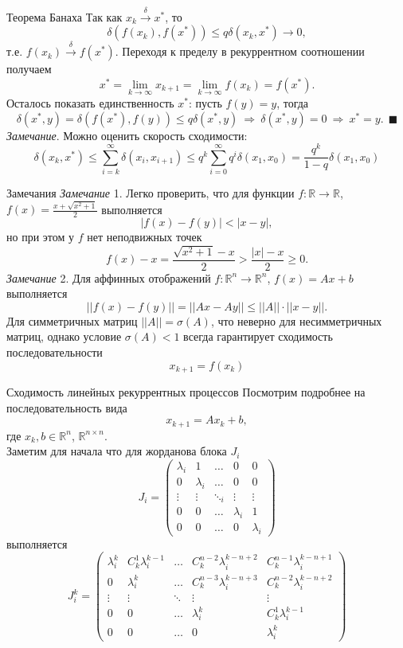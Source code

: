 \documentclass[10pt, handout]{beamer}
\begin{document}
\begin{frame}{Теорема Банаха}
Так как $x_k\xrightarrow{\delta}x^*$, то
$$
\delta(f(x_k), f(x^*))\leq q\delta(x_k, x^*)\rightarrow 0,
$$
т.е. $f(x_k)\xrightarrow{\delta}f(x^*)$. \pause Переходя к пределу в рекуррентном соотношении получаем
$$
x^*=\lim_{k\rightarrow\infty}x_{k+1}=\lim_{k\rightarrow\infty}f(x_k)=f(x^*).
$$
\pause
Осталось показать единственность $x^*$: пусть $f(y)=y$, тогда
$$
\delta(x^*, y)=\delta (f(x^*), f(y))\leq q\delta(x^*, y)~\Rightarrow~\delta(x^*, y)=0~\Rightarrow~x^*=y.~~\blacksquare
$$
\pause
\textit{Замечание}. Можно оценить скорость сходимости:
$$
\delta(x_k, x^*)\leq \sum_{i=k}^\infty \delta(x_i, x_{i+1})\leq q^k\sum_{i=0}^\infty q^i\delta(x_1, x_0)=\frac{q^k}{1-q}\delta(x_1, x_0)
$$
\end{frame}

\begin{frame}{Замечания}
\textit{Замечание} 1. Легко проверить, что для функции $f:\mathbb{R}\rightarrow\mathbb{R}$, $f(x)=\frac{x+\sqrt{x^2+1}}{2}$ выполняется
$$
|f(x)-f(y)|<|x-y|,
$$
но при этом у $f$ нет неподвижных точек
$$
f(x)-x=\frac{\sqrt{x^2+1}-x}{2}> \frac{|x|-x}{2}\geq 0.
$$
\pause
\textit{Замечание} 2. Для аффинных отображений $f:\mathbb{R}^n\rightarrow\mathbb{R}^n$, $f(x)=Ax+b$ выполняется
$$
||f(x)-f(y)||=||Ax-Ay||\leq ||A||\cdot||x-y||.
$$
Для симметричных матриц $||A||=\sigma(A)$, что неверно для несимметричных матриц, однако условие $\sigma(A)<1$ всегда гарантирует сходимость последовательности
$$
x_{k+1}=f(x_k)
$$
\end{frame}

\begin{frame}{Сходимость линейных рекуррентных процессов}
Посмотрим подробнее на последовательность вида
\begin{equation}\label{linear_process}
x_{k+1}=Ax_k+b,
\end{equation}
где $x_k, b\in \mathbb{R}^n$, $\mathbb{R}^{n\times n}$. \\
\vspace{1em}
\pause
Заметим для начала что для жорданова блока $J_i$ 
$$
J_i=\left(
\begin{array}{ccccc}
\lambda_i & 1 & \ldots & 0 & 0\\
0 & \lambda_i & \ldots & 0 & 0\\
\vdots & \vdots & \ddots_i & \vdots & \vdots \\
0 & 0 & \ldots & \lambda_i & 1\\
0 & 0 & \ldots & 0 & \lambda_i
\end{array}
\right)
$$
выполняется
$$
J_i^k=\left(
\begin{array}{ccccc}
\lambda^k_i & C_k^1\lambda^{k-1}_i & \ldots & C^{n-2}_k\lambda^{k-n+2}_i & C^{n-1}_k\lambda^{k-n+1}_i\\
0 & \lambda^k_i & \ldots & C^{n-3}_k\lambda^{k-n+3}_i & C^{n-2}_k\lambda^{k-n+2}_i\\
\vdots & \vdots & \ddots & \vdots & \vdots \\
0 & 0 & \ldots & \lambda^k_i & C_k^1\lambda^{k-1}_i\\
0 & 0 & \ldots & 0 & \lambda^k_i
\end{array}
\right)
$$
\end{frame}
\end{document}
